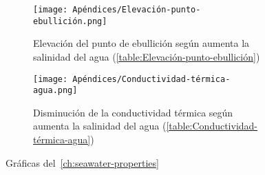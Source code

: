 \begin{figure}[H]
	\centering
	\begin{subfigure}{0.45\linewidth}
		\centering
		\texttt{[image: Apéndices/Elevación-punto-ebullición.png]}
		\caption{Elevación del punto de ebullición según aumenta la salinidad del agua (\cref{table:Elevación-punto-ebullición})}
		\label{fig:Elevación-punto-ebullición}
	\end{subfigure}
	\hfill
	\begin{subfigure}{0.45\linewidth}
		\centering
		\texttt{[image: Apéndices/Conductividad-térmica-agua.png]}
		\caption{Disminución de la conductividad térmica según aumenta la salinidad del agua (\cref{table:Conductividad-térmica-agua})}
		\label{fig:Conductividad-térmica-agua}
	\end{subfigure}
	\caption{Gráficas del~\cref{ch:seawater-properties}}
	\label{fig:graficas-propiedades-agua-salinidad}
\end{figure}	